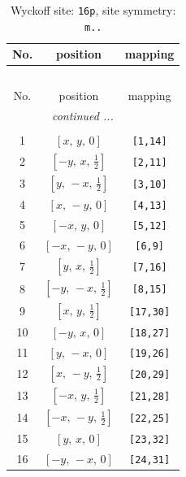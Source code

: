 \documentclass[fleqn,8pt]{jsarticle}
\begin{document}
\begin{longtable}{ccc}
\caption{Wyckoff site: {\tt 16p}, site symmetry: {\tt m..}}
 \\
 \hline \hline
No. & position & mapping \\ \hline \endfirsthead

\multicolumn{2}{l}{\tablename\ \thetable{}} \\
 \hline \hline
No. & position & mapping \\ \hline \endhead

 \hline \hline
\multicolumn{2}{r}{\footnotesize\it continued ...} \\ \endfoot

 \hline \hline
\multicolumn{2}{r}{} \\ \endlastfoot

1 & $\left[ x,\, y,\, 0 \right]$ & {\tt [1,14]} \\ \hline
2 & $\left[ - y,\, x,\, \frac{1}{2} \right]$ & {\tt [2,11]} \\ \hline
3 & $\left[ y,\, - x,\, \frac{1}{2} \right]$ & {\tt [3,10]} \\ \hline
4 & $\left[ x,\, - y,\, 0 \right]$ & {\tt [4,13]} \\ \hline
5 & $\left[ - x,\, y,\, 0 \right]$ & {\tt [5,12]} \\ \hline
6 & $\left[ - x,\, - y,\, 0 \right]$ & {\tt [6,9]} \\ \hline
7 & $\left[ y,\, x,\, \frac{1}{2} \right]$ & {\tt [7,16]} \\ \hline
8 & $\left[ - y,\, - x,\, \frac{1}{2} \right]$ & {\tt [8,15]} \\ \hline
9 & $\left[ x,\, y,\, \frac{1}{2} \right]$ & {\tt [17,30]} \\ \hline
10 & $\left[ - y,\, x,\, 0 \right]$ & {\tt [18,27]} \\ \hline
11 & $\left[ y,\, - x,\, 0 \right]$ & {\tt [19,26]} \\ \hline
12 & $\left[ x,\, - y,\, \frac{1}{2} \right]$ & {\tt [20,29]} \\ \hline
13 & $\left[ - x,\, y,\, \frac{1}{2} \right]$ & {\tt [21,28]} \\ \hline
14 & $\left[ - x,\, - y,\, \frac{1}{2} \right]$ & {\tt [22,25]} \\ \hline
15 & $\left[ y,\, x,\, 0 \right]$ & {\tt [23,32]} \\ \hline
16 & $\left[ - y,\, - x,\, 0 \right]$ & {\tt [24,31]} \\
\end{longtable}
\renewcommand{\arraystretch}{1.2}
\end{document}
